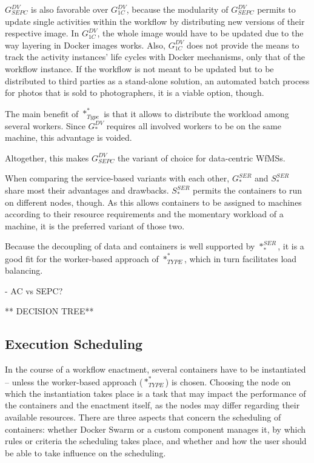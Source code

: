   $G_{SEPC}^{DV}$ is also favorable over $G_{1C}^{DV}$, because the modularity of $G_{SEPC}^{DV}$ permits to update single activities within the workflow by distributing new versions of their respective image. In $G_{1C}^{DV}$, the whole image would have to be updated due to the way layering in Docker images works. Also, $G_{1C}^{DV}$ does not provide the means to track the activity instances' life cycles with Docker mechanisms, only that of the workflow instance. If the workflow is not meant to be updated but to be distributed to third parties as a stand-alone solution, \eg an automated batch process for photos that is sold to photographers, it is a viable option, though.

  The main benefit of $*_{Type}^{*}$ is that it allows to distribute the workload among several workers. Since $G_{*}^{DV}$ requires all involved workers to be on the same machine, this advantage is voided.

  Altogether, this makes $G_{SEPC}^{DV}$ the variant of choice for data-centric \acp{WfMS}.

  When comparing the service-based variants with each other, $G_{*}^{SER}$ and $S_{*}^{SER}$ share most their advantages and drawbacks. $S_{*}^{SER}$ permits the containers to run on different nodes, though. As this allows containers to be assigned to machines according to their resource requirements and the momentary workload of a machine, it is the preferred variant of those two.

  Because the decoupling of data and containers is well supported by $*_{*}^{SER}$, it is a good fit for the worker-based approach of $*_{TYPE}^{*}$, which in turn facilitates load balancing.

    - AC vs SEPC?

  ** DECISION TREE**


\subsection{Execution Scheduling} %
\label{sub:execution_scheduling}
  In the course of a workflow enactment, several containers have to be instantiated -- unless the worker-based approach ($*_{TYPE}^{*}$) is chosen. Choosing the node on which the instantiation takes place is a task that may impact the performance of the containers and the enactment itself, as the nodes may differ regarding their available resources. There are three aspects that concern the scheduling of containers: whether Docker Swarm or a custom component manages it, by which rules or criteria the scheduling takes place, and whether and how the user should be able to take influence on the scheduling.

